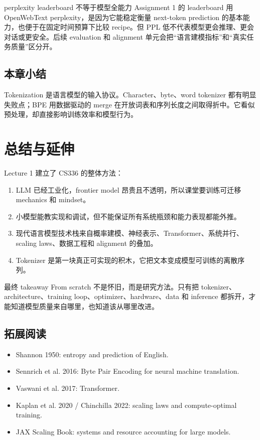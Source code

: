 \documentclass[a4paper]{article}
\begin{document}
\begin{warningbox}{perplexity leaderboard 不等于模型全能力}
Assignment 1 的 leaderboard 用 OpenWebText perplexity，是因为它能稳定衡量 next-token prediction 的基本能力，也便于在固定时间预算下比较 recipe。但 PPL 低不代表模型更会推理、更会对话或更安全。后续 evaluation 和 alignment 单元会把“语言建模指标”和“真实任务质量”区分开。
\end{warningbox}

\subsection{本章小结}

Tokenization 是语言模型的输入协议。Character、byte、word tokenizer 都有明显失败点；BPE 用数据驱动的 merge 在开放词表和序列长度之间取得折中。它看似预处理，却直接影响训练效率和模型行为。

\section{总结与延伸}

Lecture 1 建立了 CS336 的整体方法：

\begin{enumerate}
    \item LLM 已经工业化，frontier model 昂贵且不透明，所以课堂要训练可迁移 mechanics 和 mindset。
    \item 小模型能教实现和调试，但不能保证所有系统瓶颈和能力表现都能外推。
    \item 现代语言模型技术栈来自概率建模、神经表示、Transformer、系统并行、scaling laws、数据工程和 alignment 的叠加。
    \item Tokenizer 是第一块真正可实现的积木，它把文本变成模型可训练的离散序列。
\end{enumerate}

\begin{importantbox}{最终 takeaway}
From scratch 不是怀旧，而是研究方法。只有把 tokenizer、architecture、training loop、optimizer、hardware、data 和 inference 都拆开，才能知道模型质量来自哪里，也知道该从哪里改进。
\end{importantbox}

\subsection{拓展阅读}

\begin{itemize}
    \item Shannon 1950: entropy and prediction of English.
    \item Sennrich et al. 2016: Byte Pair Encoding for neural machine translation.
    \item Vaswani et al. 2017: Transformer.
    \item Kaplan et al. 2020 / Chinchilla 2022: scaling laws and compute-optimal training.
    \item JAX Scaling Book: systems and resource accounting for large models.
\end{itemize}
\end{document}
